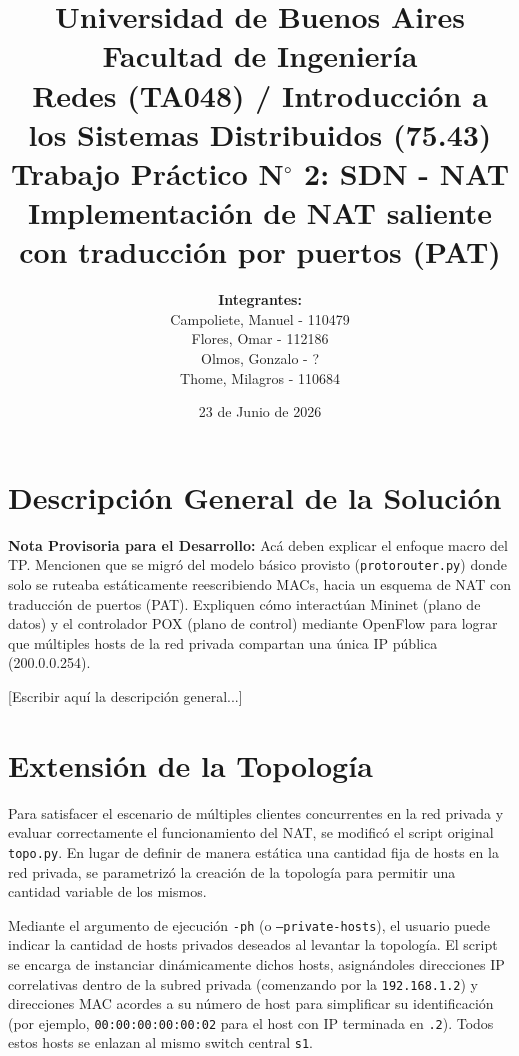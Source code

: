 \documentclass[11pt, a4paper]{article}
\title{
    \normalsize Universidad de Buenos Aires \\
    \normalsize Facultad de Ingeniería \\
    \normalsize Redes (TA048) / Introducción a los Sistemas Distribuidos (75.43) \\ [2cm]
    \Large \textbf{Trabajo Práctico N$^{\circ}$ 2: SDN - NAT} \\
    \large Implementación de NAT saliente con traducción por puertos (PAT) \\ [1cm]
}
\author{
    \textbf{Integrantes:} \\
    Campoliete, Manuel - 110479 \\
    Flores, Omar - 112186 \\
    Olmos, Gonzalo - ? \\
    Thome, Milagros - 110684 \\
    [2cm]
}
\date{23 de Junio de 2026} %
\begin{document}
\maketitle
\thispagestyle{empty}
\clearpage
\tableofcontents
\clearpage

\section{Descripción General de la Solución}
\label{sec:descripcion_general}

\begin{small}
\color{blue}
\textbf{Nota Provisoria para el Desarrollo:} 
Acá deben explicar el enfoque macro del TP. Mencionen que se migró del modelo básico provisto (\texttt{protorouter.py}) donde solo se ruteaba estáticamente reescribiendo MACs, hacia un esquema de NAT con traducción de puertos (PAT). Expliquen cómo interactúan Mininet (plano de datos) y el controlador POX (plano de control) mediante OpenFlow para lograr que múltiples hosts de la red privada compartan una única IP pública (200.0.0.254).
\end{small}

\vspace{0.5cm}
[Escribir aquí la descripción general...]


\section{Extensión de la Topología}
\label{sec:extension_topologia}

Para satisfacer el escenario de múltiples clientes concurrentes en la red privada y evaluar correctamente el funcionamiento del NAT, se modificó el script original \texttt{topo.py}. En lugar de definir de manera estática una cantidad fija de hosts en la red privada, se parametrizó la creación de la topología para permitir una cantidad variable de los mismos.

Mediante el argumento de ejecución \texttt{-ph} (o \texttt{--private-hosts}), el usuario puede indicar la cantidad de hosts privados deseados al levantar la topología. El script se encarga de instanciar dinámicamente dichos hosts, asignándoles direcciones IP correlativas dentro de la subred privada (comenzando por la \texttt{192.168.1.2}) y direcciones MAC acordes a su número de host para simplificar su identificación (por ejemplo, \texttt{00:00:00:00:00:02} para el host con IP terminada en \texttt{.2}). Todos estos hosts se enlazan al mismo switch central \texttt{s1}.
\end{document}
